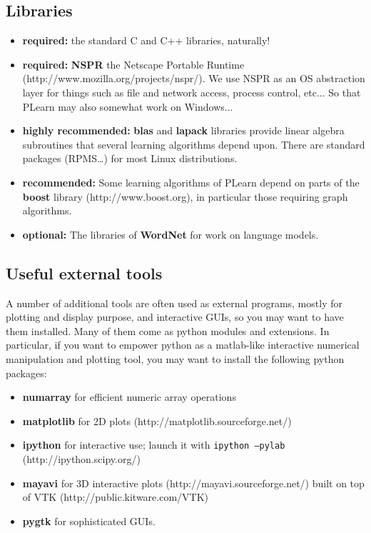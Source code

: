 \documentclass[11pt]{book}
\begin{document}
\subsection{Libraries}

\begin{itemize}
\item {\bf required:} the standard C and C++ libraries, naturally!
\item {\bf required:} {\bf NSPR} the Netscape Portable Runtime
  (http://www.mozilla.org/projects/nspr/). We use NSPR as an OS abstraction
  layer for things such as file and network access, process control, etc...
So that PLearn may also somewhat work on Windows...
\item {\bf highly recommended:} {\bf blas} and {\bf lapack} libraries provide linear algebra
  subroutines that several learning algorithms depend upon. There are standard
  packages (RPMS\ldots) for most Linux distributions.
\item {\bf recommended:} Some learning algorithms of PLearn depend on parts
  of the {\bf boost} library (http://www.boost.org), in particular those
  requiring graph algorithms.
\item {\bf optional:} The libraries of {\bf WordNet} for work on language models.
\end{itemize}

\subsection{Useful external tools}

A number of additional tools are often used as external programs, mostly for plotting and
display purpose, and interactive GUIs, so you may want to have them installed. 
Many of them come as python modules and extensions. In particular, if you
want to empower python as a matlab-like interactive numerical manipulation
and plotting tool, you may want to install the following python packages:

\begin{itemize}
\item {\bf numarray} for efficient numeric array operations
\item {\bf matplotlib} for 2D plots (http://matplotlib.sourceforge.net/)
\item {\bf ipython} for interactive use; launch it with {\tt ipython --pylab} (http://ipython.scipy.org/) 
\item {\bf mayavi} for 3D interactive plots (http://mayavi.sourceforge.net/) built on top of VTK (http://public.kitware.com/VTK)
\item {\bf pygtk} for sophisticated GUIs.
\end{itemize}
\end{document}

